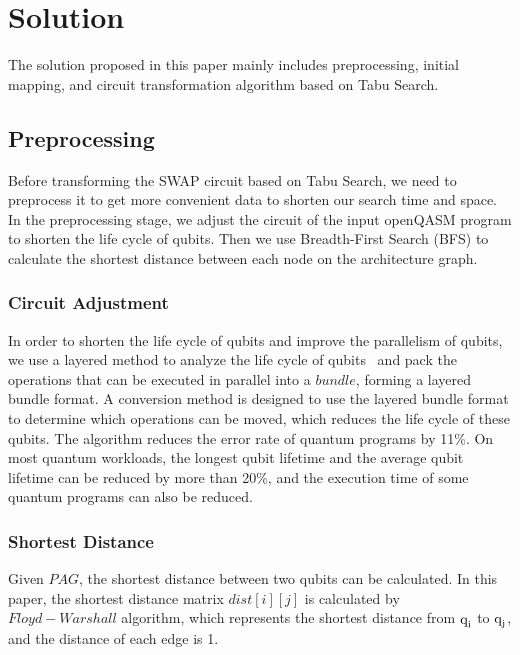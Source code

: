 \documentclass[runningheads]{llncs}
\begin{document}
\section{Solution}
\label{Solution}
The solution proposed in this paper mainly includes preprocessing, initial mapping, and circuit transformation algorithm based on Tabu Search.
\subsection{Preprocessing}
Before transforming the SWAP circuit based on Tabu Search, we need to preprocess it to get more convenient data to shorten our search time and space. In the preprocessing stage, we adjust the circuit of the input openQASM program to shorten the life cycle of qubits. Then we use Breadth-First Search (BFS) to calculate the shortest distance between each node on the architecture graph.
\subsubsection{Circuit Adjustment}
In order to shorten the life cycle of qubits and improve the parallelism of qubits, we use a layered method to analyze the life cycle of qubits~\cite{2019Zhang} and pack the operations that can be executed in parallel into a $bundle$, forming a layered bundle format.
A conversion method is designed to use the layered bundle format to determine which operations can be moved, which reduces the life cycle of these qubits. The algorithm reduces the error rate of quantum programs by 11\%. On most quantum workloads, the longest qubit lifetime and the average qubit lifetime can be reduced by more than 20\%, and the execution time of some quantum programs can also be reduced.
\subsubsection{Shortest Distance}
Given $PAG$, the shortest distance between two qubits can be calculated. In this paper, the shortest distance matrix $dist[i][j]$ is calculated by $Floyd-Warshall$ algorithm, which represents the shortest distance from $\textup{q}_{\textup{i}}$ to $\textup{q}_{\textup{j}}$, and the distance of each edge is 1. 
\end{document}
